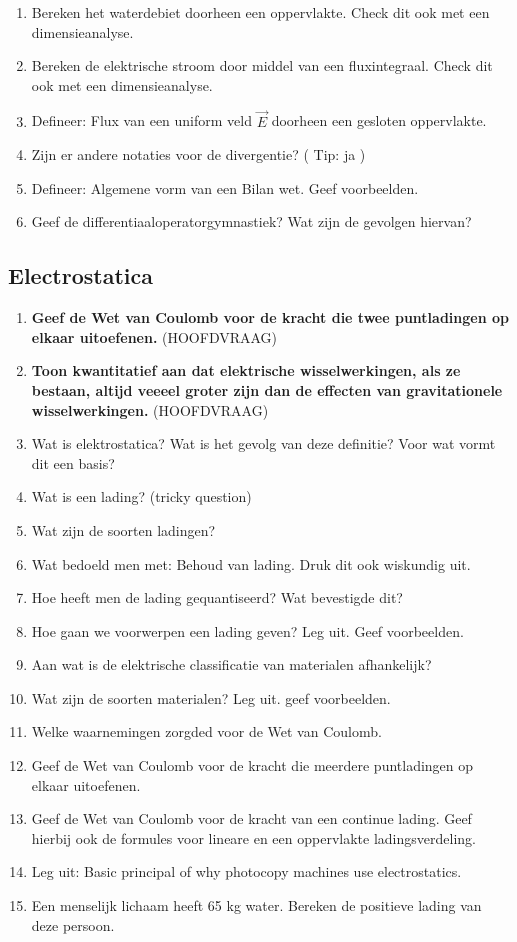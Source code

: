 \documentclass[12pt]{article}
\begin{document}
\begin{enumerate}
        \item Bereken het waterdebiet doorheen een oppervlakte. Check dit ook met een dimensieanalyse.
        \item Bereken de elektrische stroom door middel van een fluxintegraal. Check dit ook met een dimensieanalyse.
        \item Defineer: Flux van een uniform veld $\vec{E}$ doorheen een gesloten oppervlakte.
        \item Zijn er andere notaties voor de divergentie? ( Tip: ja )
        \item Defineer: Algemene vorm van een Bilan wet. Geef voorbeelden.
        \item Geef de differentiaaloperatorgymnastiek? Wat zijn de gevolgen hiervan?
    \end{enumerate}
    \subsection{Electrostatica}
    \begin{enumerate}
        \item \textbf{Geef de Wet van Coulomb voor de kracht die twee puntladingen op elkaar uitoefenen.} (HOOFDVRAAG)
        \item \textbf{Toon kwantitatief aan dat elektrische wisselwerkingen, als ze bestaan, altijd veeeel groter zijn dan de effecten van gravitationele wisselwerkingen.} (HOOFDVRAAG)
        \item Wat is elektrostatica? Wat is het gevolg van deze definitie? Voor wat vormt dit een basis? 
        \item Wat is een lading? (tricky question)
        \item Wat zijn de soorten ladingen?
        \item Wat bedoeld men met: Behoud van lading. Druk dit ook wiskundig uit.
        \item Hoe heeft men de lading gequantiseerd? Wat bevestigde dit?
        \item Hoe gaan we voorwerpen een lading geven? Leg uit. Geef voorbeelden.
        \item Aan wat is de elektrische classificatie van materialen afhankelijk?
        \item Wat zijn de soorten materialen? Leg uit. geef voorbeelden.
        \item Welke waarnemingen zorgded voor de Wet van Coulomb.
        \item Geef de Wet van Coulomb voor de kracht die meerdere puntladingen op elkaar uitoefenen.
        \item Geef de Wet van Coulomb voor de kracht van een continue lading. Geef hierbij ook de formules voor lineare en een oppervlakte ladingsverdeling.
        \item Leg uit: Basic principal of why photocopy machines use electrostatics.
        \item Een menselijk lichaam heeft 65 kg water. Bereken de positieve lading van deze persoon.
    \end{enumerate}
\end{document}
